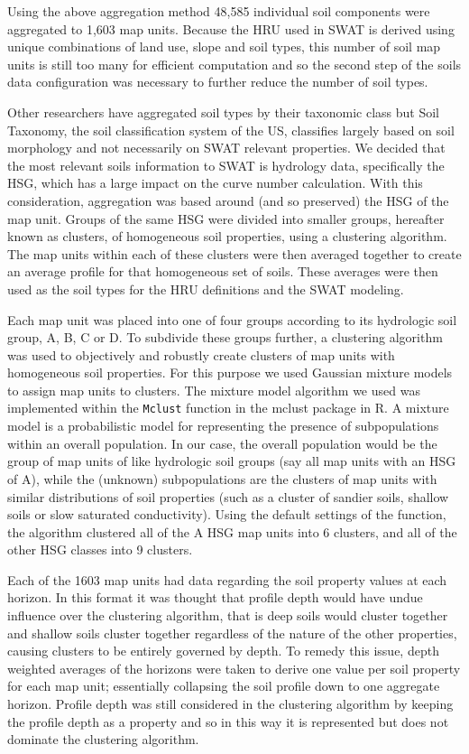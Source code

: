 Using the above aggregation method 48,585 individual soil components were
aggregated to 1,603 map units. Because the HRU used in
SWAT is derived using unique combinations of land use, slope and soil types,
this number of soil map units is still too many for efficient computation  and so
the second step of the soils data configuration was necessary to further reduce
the number of soil types.

Other researchers have aggregated soil types by their taxonomic class
\citep{gatzke_aggregation_2011} but Soil Taxonomy, the soil classification
system of the US, classifies largely based on soil morphology and not
necessarily on SWAT relevant properties. We decided that the most relevant soils
information to SWAT is hydrology data, specifically the HSG, which has a large impact on the curve number calculation. With this
consideration, aggregation was based around (and so preserved) the HSG of the
map unit. Groups of the same HSG were divided into smaller groups, hereafter
known as clusters, of homogeneous soil properties, using a clustering algorithm.
The map units within each of these clusters were then averaged together to create
an average profile for that homogeneous set of soils. These averages were then
used as the soil types for the HRU definitions and the SWAT modeling.

Each map unit was placed into one of four groups according to its hydrologic soil
group, A, B, C or D. To subdivide these groups further, a clustering algorithm
was used to objectively and robustly create clusters of map units with
homogeneous soil properties. For this purpose we used Gaussian mixture models to
assign map units to clusters. The mixture model algorithm we used was implemented within the
\texttt{Mclust} function in the mclust package \citep{fraley_mclust_2012} in R.
A mixture model is a probabilistic model for representing the presence of
subpopulations within an overall population. In our case, the overall population
would be the group of map units of like hydrologic soil groups (say all map units
with an HSG of A), while the (unknown) subpopulations are the clusters of
map units with similar distributions of soil properties (such as a cluster of
sandier soils, shallow soils or slow saturated conductivity). Using the default
settings of the function, the algorithm clustered all of the A HSG map units into
6 clusters, and all of the other HSG classes into 9 clusters.

Each of the 1603 map units had data regarding the soil property values at each
horizon. In this format it was thought that profile depth would have undue influence over the clustering algorithm, that is deep soils would cluster together and shallow soils cluster together regardless of the nature of the other properties, causing clusters to be entirely governed by
depth. To remedy this issue, depth weighted averages of the horizons were taken
to derive one value per soil property for each map unit; essentially collapsing
the soil profile down to one aggregate horizon. Profile depth was still
considered in the clustering algorithm by keeping the profile depth as a
property and so in this way it is represented but does not dominate the clustering
algorithm.

